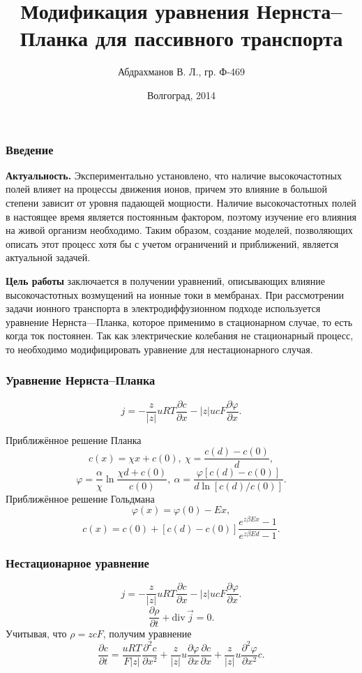 \documentclass[10pt,pdf]{beamer}
\date{Волгоград, 2014}
\title{Модификация уравнения Нернста--Планка для пассивного транспорта}
\author{Абдрахманов В. Л., гр. Ф-469}
\institute{Руководитель --- профессор, д.ф.-м.н. Шеин А. Г.}
\newcommand{\pder}[2] {\frac{\partial #1}{\partial #2}}
\newcommand{\ppder}[2]{\frac{\partial^2 #1}{\partial {#2}^2}}
\newcommand{\abs}[1]{\left| #1 \right|}
\renewcommand{\phi}{\varphi}
\newcommand{\divergence}{\mathrm{div\,}}
\begin{document}
  \frame{\titlepage}
  \begin{frame}
    \frametitle{Введение}

    \textbf{Актуальность.} Экспериментально установлено, что наличие
    высокочастотных полей влияет на процессы движения ионов, причем это
    влияние в большой степени зависит от уровня падающей мощности.
    Наличие высокочастотных полей в настоящее время является постоянным
    фактором, поэтому изучение его влияния на живой организм необходимо.
    Таким образом, создание моделей, позволяющих описать этот процесс
    хотя бы с учетом ограничений и приближений, является актуальной
    задачей.

    \textbf{Цель работы} заключается в получении уравнений, описывающих
влияние высокочастотных возмущений на ионные токи в мембранах. При
рассмотрении задачи ионного транспорта в электродиффузионном подходе
используется уравнение Нернста—Планка, которое применимо в
стационарном случае, то есть когда ток постоянен. Так как электрические
колебания не стационарный процесс, то необходимо модифицировать
уравнение для нестационарного случая.
\end{frame}
  \begin{frame}
    \frametitle{Уравнение Нернста--Планка}
    \begin{equation}
        j = -\frac{z}{\abs{z}}uRT\pder{c}{x} -
        \abs{z}ucF\pder{\phi}{x}.
        \label{eq:nernst-plank}
    \end{equation}

      Приближённое решение Планка
      \begin{equation}
          c(x) = \chi x + c(0),\ \chi = \frac{c(d)-c(0)}{d},
      \end{equation}
      \begin{equation}
          \phi = \frac{\alpha}{\chi}\ln\frac{\chi d + c(0)}{c(0)},
          \ \alpha = \frac{\phi[c(d) - c(0)]}
          {d\ln[c(d) / c(0)]}.
      \end{equation}
      Приближённое решение Гольдмана
      \begin{equation}
          \phi(x) = \phi(0) - Ex,
      \end{equation}
      \begin{equation}
          c(x) = c(0) + [c(d) - c(0)]
          \frac{e^{z\beta Ex} - 1}{e^{z\beta Ed} - 1}.
      \end{equation}
  \end{frame}
  \begin{frame}
      \frametitle{Нестационарное уравнение}
        \begin{equation}
          j = -\frac{z}{|z|}uRT\pder{c}{x} - |z|ucF\pder{\phi}{x}.
        \end{equation}
        \begin{equation}
            \pder{\rho}{t} + \divergence\vec{j} = 0.
        \end{equation}
        Учитывая, что \( \rho = zcF \), получим уравнение
        \begin{equation}
            \pder{c}{t} = \frac{uRT}{F|z|}\ppder{c}{x} +
            \frac{z}{|z|}u\pder{\phi}{x}\pder{c}{x} +
            \frac{z}{|z|}u\ppder{\phi}{x}c.
        \end{equation}
  \end{frame}
\end{document}
